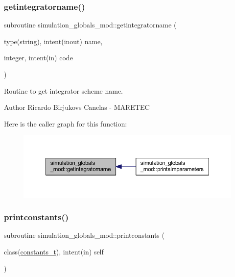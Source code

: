 \subsubsection{\texorpdfstring{getintegratorname()}{getintegratorname()}}
{\footnotesize\ttfamily subroutine simulation\+\_\+globals\+\_\+mod\+::getintegratorname (\begin{DoxyParamCaption}\item[{type(string), intent(inout)}]{name,  }\item[{integer, intent(in)}]{code }\end{DoxyParamCaption})\hspace{0.3cm}{\ttfamily [private]}}



Routine to get integrator scheme name. 

\begin{DoxyAuthor}{Author}
Ricardo Birjukovs Canelas -\/ M\+A\+R\+E\+T\+EC 
\end{DoxyAuthor}
Here is the caller graph for this function\+:\nopagebreak
\begin{figure}[H]
\begin{center}
\leavevmode
\includegraphics[width=350pt]{namespacesimulation__globals__mod_a68e871ed8e5d3930884e968c6fdafddc_icgraph}
\end{center}
\end{figure}
\mbox{\label{namespacesimulation__globals__mod_a20ba28d72a9bea823d9373a94f97026e}} 
\subsubsection{\texorpdfstring{printconstants()}{printconstants()}}
{\footnotesize\ttfamily subroutine simulation\+\_\+globals\+\_\+mod\+::printconstants (\begin{DoxyParamCaption}\item[{class(\hyperlink{structsimulation__globals__mod_1_1constants__t}{constants\+\_\+t}), intent(in)}]{self }\end{DoxyParamCaption})\hspace{0.3cm}{\ttfamily [private]}}




